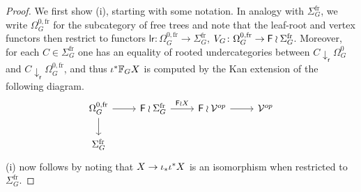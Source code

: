 \documentclass[a4paper,10pt]{article}%
\begin{document}
\begin{proof}
We first show (i), starting with some notation. 
In analogy with $\Sigma_{G}^{\text{fr}}$,
we write $\Omega_{G}^{0,\text{fr}}$ for the subcategory of free trees and note that the leaf-root and vertex functors then restrict to functors
$\mathsf{lr} \colon \Omega_{G}^{0,\text{fr}} \to \Sigma_G^{\text{fr}}$,
$V_G \colon \Omega_{G}^{0,\text{fr}} \to \mathsf{F} \wr \Sigma_G^{\text{fr}}$.
Moreover, for each $C \in \Sigma_G^{\text{fr}}$ one has an equality of rooted undercategories between
$C \downarrow_{\mathsf{r}} \Omega_{G}^0$
and
$C \downarrow_{\mathsf{r}} \Omega_{G}^{0,\text{fr}}$,
and thus 
$\iota^{\**} \mathbb{F}_G X$ is computed by the Kan extension of the following diagram.
\[
\begin{tikzcd}
	\Omega_{G}^{0,\text{fr}} \ar{d} \ar{r} &
	\Fin \wr \Sigma_G^{\text{fr}} \ar{r}{\Fin \wr X} &
	\Fin \wr \mathcal{V}^{op} \ar{r} &
	\mathcal{V}^{op}
\\
	\Sigma_G^{\text{fr}}
\end{tikzcd}
\]
(i) now follows by noting that 
$X \to \iota_{\**} \iota^{\**} X$
is an isomorphism when restricted to $\Sigma_G^{\text{fr}}$.


\end{proof}
\end{document}
